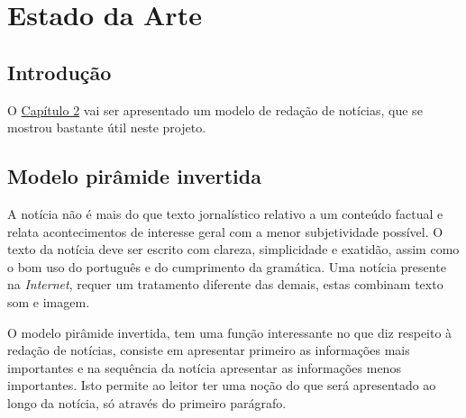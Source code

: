\chapter{Estado da Arte}
\label{chap:estado-da-arte}

\section{Introdução}
\label{chap2:sec:intro}
O \hyperref[chap:estado-da-arte]{Capítulo 2} vai ser apresentado um modelo de redação de notícias, que se mostrou bastante útil neste projeto.

\section{Modelo pirâmide invertida}
\label{chap2:sec:...}
A notícia não é mais do que texto jornalístico relativo a um conteúdo factual e relata acontecimentos de interesse geral com a menor subjetividade possível.
O texto da notícia deve ser escrito com clareza, simplicidade e exatidão, assim como o bom uso do português e do cumprimento da gramática.
Uma notícia presente na \emph{Internet}, requer um tratamento diferente das demais, estas combinam texto som e imagem.\par
O modelo pirâmide invertida, tem uma função interessante no que diz respeito à redação de notícias, consiste em apresentar primeiro as informações mais importantes e na sequência da notícia apresentar as informações menos importantes. Isto permite ao leitor ter uma noção do que será apresentado ao longo da notícia, só através do primeiro parágrafo.

